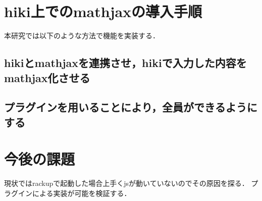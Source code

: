 \documentclass[a4j,twocolumn]{jsarticle}
\begin{document}
\section{hiki上でのmathjaxの導入手順}
本研究では以下のような方法で機能を実装する．

\subsection{hikiとmathjaxを連携させ，hikiで入力した内容をmathjax化させる}
\subsection{プラグインを用いることにより，全員ができるようにする}
\section{今後の課題}
現状ではrackupで起動した場合上手くjsが動いていないのでその原因を探る．
プラグインによる実装が可能を検証する．
\end{document}
